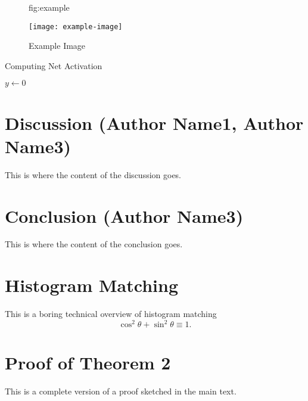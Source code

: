 \documentclass{MLIA} %
\begin{document}
\begin{figure}[htbp]
\floatconts
  {fig:example}
  {\caption{Example Image}}
  {\texttt{[image: example-image]}}
\end{figure}

\begin{algorithm2e}
\caption{Computing Net Activation}
\label{alg:net}
{}
$y\leftarrow 0$\;
\end{algorithm2e}
\section{Discussion (Author Name1, Author Name3)}
This is where the content of the discussion goes.  
\section{Conclusion (Author Name3)}
This is where the content of the conclusion goes.  



\appendix

\section{Histogram Matching}

This is a boring technical overview of histogram matching
\begin{equation}\label{eq:example}
\cos^2\theta + \sin^2\theta \equiv 1.
\end{equation}

\section{Proof of Theorem 2}

This is a complete version of a proof sketched in the main text.
\end{document}
